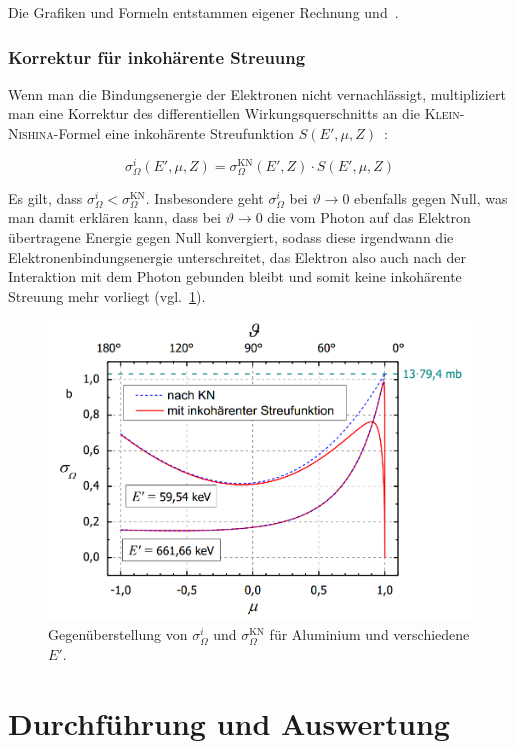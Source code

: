 \documentclass[slug=CS, room=Andreas-Schubert-Bau\,\ Labor\ 406,
supervisor=Juliane\ Volkmer, coursedate=29.\ 11.\ 2019]{../../Lab_Report_LaTeX/lab_report}
\begin{document}
Die Grafiken und Formeln entstammen eigener Rechnung und~\cite[3-5]{iktp19}.

\subsubsection{Korrektur für inkohärente Streuung}
\label{sec:cskorrektur}

Wenn man die Bindungsenergie der Elektronen nicht vernachlässigt, multipliziert man eine
Korrektur des differentiellen Wirkungsquerschnitts an die \textsc{Klein}-\textsc{Nishina}-Formel
eine inkohärente Streufunktion \(S(E', \mu, Z)\)~\cite[5-6]{iktp19}:

\begin{equation}\label{eq:knkorrektur}
        \sigma^{i}_\Omega(E', \mu, Z) = \sigma^{\text{KN}}_\Omega(E', Z) \cdot S(E', \mu, Z)
\end{equation}

Es gilt, dass \(\sigma^{i}_\Omega < \sigma^{\text{KN}}_\Omega\). Insbesondere geht
\(\sigma^{i}_\Omega\) bei \(\vartheta \rightarrow 0\) ebenfalls gegen Null, was man damit erklären
kann, dass bei \(\vartheta \rightarrow 0\) die vom Photon auf das Elektron übertragene Energie
gegen Null konvergiert, sodass diese irgendwann die Elektronenbindungsenergie unterschreitet,
das Elektron also auch nach der Interaktion mit dem Photon gebunden bleibt und somit keine
inkohärente Streuung mehr vorliegt (vgl.~\ref{fig:sigmaknkorrigiert}).

\begin{figure}[H]\centering
        \includegraphics[width=.5\columnwidth]{./pictures/sigma_kn_korrigiert.png}
        \caption{Gegenüberstellung von \(\sigma^{i}_\Omega\) und \(\sigma^{\text{KN}}_\Omega\) für
        Aluminium und verschiedene \(E'\).}
        \label{fig:sigmaknkorrigiert}
\end{figure}

\section{Durchführung und Auswertung}
\label{sec:experiment}
\end{document}
